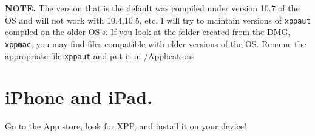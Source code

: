 \documentclass{article}
\begin{document}
{\bf NOTE.} The version that is the default was compiled under version
10.7 of the OS and will not work with 10.4,10.5, etc. I will try to
maintain versions of {\tt xppaut} compiled on the older OS's. If you
look at the folder created from the DMG, {\tt xppmac}, you may find
 files compatible with older versions of the OS. Rename the appropriate  file  {\tt xppaut} and put it in /Applications
  



\section{iPhone and iPad.}
Go to the App store, look for XPP, and install it on your device!
\end{document}
